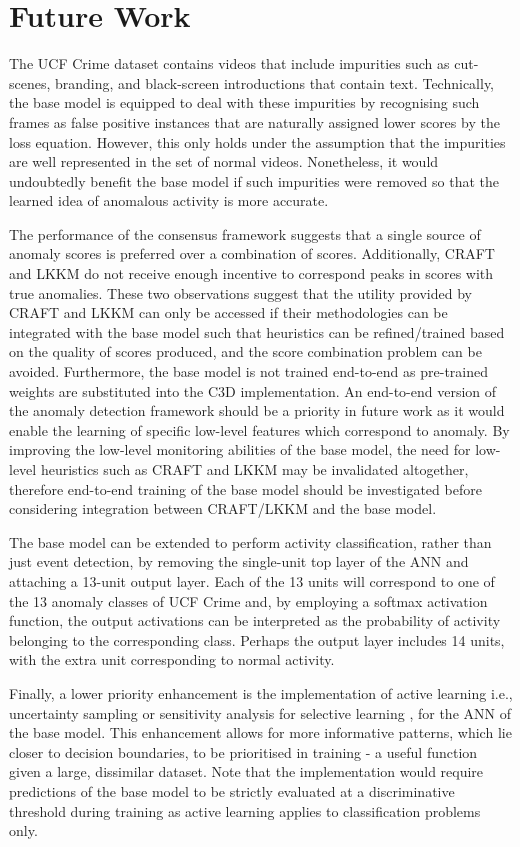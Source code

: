 \documentclass[sigplan,authorversion,nonacm, 9pt]{acmart}
\begin{document}
\section{Future Work} \label{sec:future}
The UCF Crime dataset contains videos that include impurities such as cut-scenes, branding, and black-screen introductions that contain text. Technically, the base model is equipped to deal with these impurities by recognising such frames as false positive instances that are naturally assigned lower scores by the loss equation. However, this only holds under the assumption that the impurities are well represented in the set of normal videos. Nonetheless, it would undoubtedly benefit the base model if such impurities were removed so that the learned idea of anomalous activity is more accurate. 
\par
The performance of the consensus framework suggests that a single source of anomaly scores is preferred over a combination of scores. Additionally, CRAFT and LKKM do not receive enough incentive to correspond peaks in scores with true anomalies. These two observations suggest that the utility provided by CRAFT and LKKM can only be accessed if their methodologies can be integrated with the base model such that heuristics can be refined/trained based on the quality of scores produced, and the score combination problem can be avoided. Furthermore, the base model is not trained end-to-end as pre-trained weights are substituted into the C3D implementation. An end-to-end version of the anomaly detection framework should be a priority in future work as it would enable the learning of specific low-level features which correspond to anomaly. By improving the low-level monitoring abilities of the base model, the need for low-level heuristics such as CRAFT and LKKM may be invalidated altogether, therefore end-to-end training of the base model should be investigated before considering integration between CRAFT/LKKM and the base model.
\par
The base model can be extended to perform activity classification, rather than just event detection, by removing the single-unit top layer of the ANN and attaching a 13-unit output layer. Each of the 13 units will correspond to one of the 13 anomaly classes of UCF Crime and, by employing a softmax activation function, the output activations can be interpreted as the probability of activity belonging to the corresponding class. Perhaps the output layer includes 14 units, with the extra unit corresponding to normal activity.
\par
Finally, a lower priority enhancement is the implementation of active learning i.e., uncertainty sampling \cite{alus} or sensitivity analysis for selective learning \cite{sasla}, for the ANN of the base model. This enhancement allows for more informative patterns, which lie closer to decision boundaries, to be prioritised in training - a useful function given a large, dissimilar dataset. Note that the implementation would require predictions of the base model to be strictly evaluated at a discriminative threshold during training as active learning applies to classification problems only.  
\end{document}
